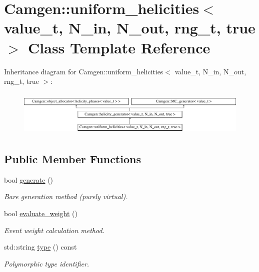 \hypertarget{a00563}{}\section{Camgen\+:\+:uniform\+\_\+helicities$<$ value\+\_\+t, N\+\_\+in, N\+\_\+out, rng\+\_\+t, true $>$ Class Template Reference}
\label{a00563}
Inheritance diagram for Camgen\+:\+:uniform\+\_\+helicities$<$ value\+\_\+t, N\+\_\+in, N\+\_\+out, rng\+\_\+t, true $>$\+:\begin{figure}[H]
\begin{center}
\leavevmode
\includegraphics[height=2.204725cm]{a00563}
\end{center}
\end{figure}
\subsection*{Public Member Functions}
\begin{DoxyCompactItemize}
\item 
bool \hyperlink{a00563_acc8bc9c14f4b084d79b53429a8a77e5a}{generate} ()
\begin{DoxyCompactList}\small\item\em \textquotesingle{}Bare generation\textquotesingle{} method (purely virtual). \end{DoxyCompactList}\item 
\hypertarget{a00563_a95e23a62e7068f1502a161d9a0f30dc8}{}bool \hyperlink{a00563_a95e23a62e7068f1502a161d9a0f30dc8}{evaluate\+\_\+weight} ()\label{a00563_a95e23a62e7068f1502a161d9a0f30dc8}

\begin{DoxyCompactList}\small\item\em Event weight calculation method. \end{DoxyCompactList}\item 
\hypertarget{a00563_acf12c6a51b1b77083f196504974c937e}{}std\+::string \hyperlink{a00563_acf12c6a51b1b77083f196504974c937e}{type} () const \label{a00563_acf12c6a51b1b77083f196504974c937e}

\begin{DoxyCompactList}\small\item\em Polymorphic type identifier. \end{DoxyCompactList}\end{DoxyCompactItemize}
